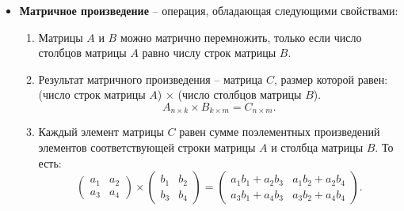 \documentclass[11pt, a4paper]{extarticle}
\begin{document}
\begin{itemize}
	\item \textbf{Матричное произведение} – операция, обладающая следующими свойствами:
	\begin{enumerate}
		\item Матрицы $A$ и $B$ можно матрично перемножить, только если число столбцов матрицы $A$ равно числу строк матрицы $B$.
		\item Результат матричного произведения – матрица $C$, размер которой равен: (число строк матрицы $A$) $\times$ (число столбцов матрицы $B$).
		\[
		A_{n\times k} \times B_{k \times m} = C_{n \times m}.
		\]
		\item Каждый элемент матрицы $C$ равен сумме поэлементных произведений элементов соответствующей строки матрицы $A$ и столбца матрицы $B$. То есть: 
		\[
		\begin{pmatrix}
		a_1 & a_2 \\
		a_3 & a_4
		\end{pmatrix} \times \begin{pmatrix}
		b_1 & b_2 \\
		b_3 & b_4
		\end{pmatrix} = \begin{pmatrix}
		a_1b_1 + a_2b_3 & a_1b_2 + a_2b_4 \\
		a_3b_1 + a_4b_3 & a_3b_2 + a_4b_4
		\end{pmatrix}.
		\]
	\end{enumerate}
\end{itemize}
\end{document}
